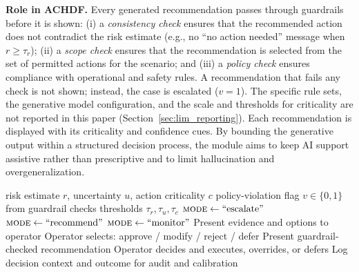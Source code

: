 \documentclass[journal]{IEEEtran}
\theoremstyle{plain}
\theoremstyle{definition}
\begin{document}
    \textbf{Role in ACHDF.}
    Every generated recommendation passes through guardrails before it is shown: (i) a \emph{consistency check} ensures that the recommended action does not contradict the risk estimate (e.g., no ``no action needed'' message when $r \ge \tau_r$); (ii) a \emph{scope check} ensures that the recommendation is selected from the set of permitted actions for the scenario; and (iii) a \emph{policy check} ensures compliance with operational and safety rules. A recommendation that fails any check is not shown; instead, the case is escalated ($v=1$).
    The specific rule sets, the generative model configuration, and the scale and thresholds for criticality are not reported in this paper (Section~\ref{sec:lim_reporting}).
    Each recommendation is displayed with its criticality and confidence cues. By bounding the generative output within a structured decision process, the module aims to keep AI support assistive rather than prescriptive and to limit hallucination and overgeneralization.
    \begin{algorithm}[t]
        \caption{Uncertainty-aware escalation and human override policy}
        \label{alg:escalation}
        \begin{algorithmic}[1]
            \Require risk estimate $r$, uncertainty $u$, action criticality $c$
            \Require policy-violation flag $v \in \{0,1\}$ from guardrail checks
            \Require thresholds $\tau_r, \tau_u, \tau_c$
            \State $\textsc{mode} \leftarrow \text{``escalate''}$ 
            \State $\textsc{mode} \leftarrow \text{``recommend''}$ 
            \Else
            \State $\textsc{mode} \leftarrow \text{``monitor''}$
            \EndIf
            \State Present evidence and options to operator
            \State Operator selects: approve / modify / reject / defer
            \State Present guardrail-checked recommendation
            \State Operator decides and executes, overrides, or defers
            \EndIf
            \State Log decision context and outcome for audit and calibration
        \end{algorithmic}
    \end{algorithm}
\end{document}
